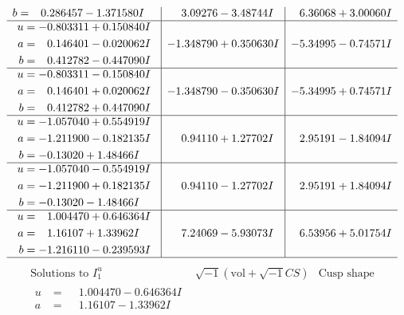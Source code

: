 \documentclass[1p]{elsarticle_modified}
\theoremstyle{definition}
\newcommand{\I}{\sqrt{-1}}
\begin{document}
$$\begin{array}{c|c|c}
\begin{aligned}
b &= \phantom{-}0.286457 - 1.371580 I\end{aligned}
 & \phantom{-}3.09276 - 3.48744 I & \phantom{-}6.36068 + 3.00060 I \\ \hline\begin{aligned}
u &= -0.803311 + 0.150840 I \\
a &= \phantom{-}0.146401 - 0.020062 I \\
b &= \phantom{-}0.412782 - 0.447090 I\end{aligned}
 & -1.348790 + 0.350630 I & -5.34995 - 0.74571 I \\ \hline\begin{aligned}
u &= -0.803311 - 0.150840 I \\
a &= \phantom{-}0.146401 + 0.020062 I \\
b &= \phantom{-}0.412782 + 0.447090 I\end{aligned}
 & -1.348790 - 0.350630 I & -5.34995 + 0.74571 I \\ \hline\begin{aligned}
u &= -1.057040 + 0.554919 I \\
a &= -1.211900 - 0.182135 I \\
b &= -0.13020 + 1.48466 I\end{aligned}
 & \phantom{-}0.94110 + 1.27702 I & \phantom{-}2.95191 - 1.84094 I \\ \hline\begin{aligned}
u &= -1.057040 - 0.554919 I \\
a &= -1.211900 + 0.182135 I \\
b &= -0.13020 - 1.48466 I\end{aligned}
 & \phantom{-}0.94110 - 1.27702 I & \phantom{-}2.95191 + 1.84094 I \\ \hline\begin{aligned}
u &= \phantom{-}1.004470 + 0.646364 I \\
a &= \phantom{-}1.16107 + 1.33962 I \\
b &= -1.216110 - 0.239593 I\end{aligned}
 & \phantom{-}7.24069 - 5.93073 I & \phantom{-}6.53956 + 5.01754 I\\
 \hline 
 \end{array}$$\newpage$$\begin{array}{c|c|c}  
\text{Solutions to }I^u_{1}& \I (\text{vol} + \sqrt{-1}CS) & \text{Cusp shape}\\
 \hline 
\begin{aligned}
u &= \phantom{-}1.004470 - 0.646364 I \\
a &= \phantom{-}1.16107 - 1.33962 I \\

\end{aligned}
\end{array}$$
\end{document}
